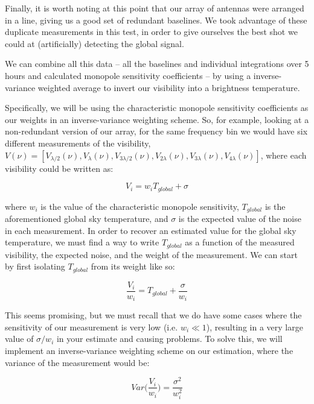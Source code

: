 Finally, it is worth noting at this point that our array of antennas were 
arranged in a line, giving us a good set of redundant baselines. We took 
advantage of these duplicate measurements in this test, in order to give 
ourselves the best shot we could at (artificially) detecting the global signal.

We can combine all this data -- all the baselines and individual integrations 
over 5 hours and calculated monopole sensitivity coefficients -- by using a 
inverse-variance weighted average to invert our visibility into a brightness 
temperature.

Specifically, we will be using the characteristic monopole sensitivity 
coefficients as our weights in an inverse-variance weighting scheme. So, for 
example, looking at a non-redundant version of our array, for the same 
frequency bin we would have six different measurements of the visibility, 
$V(\nu) = [V_{\lambda/2}(\nu), V_{\lambda}(\nu), V_{3\lambda/2}(\nu), 
V_{2\lambda}(\nu), V_{3\lambda}(\nu), V_{4\lambda}(\nu)]$, where each 
visibility could be written as:

\begin{equation}
    V_i = w_i T_{global} + \sigma
    \label{eq:vis-weight}
\end{equation}

where $w_i$ is the value of the characteristic monopole sensitivity, 
$T_{global}$ is the aforementioned global sky temperature, and $\sigma$ is the 
expected value of the noise in each measurement. In order to recover an 
estimated value for the global sky temperature, we must find a way to write 
$T_{global}$ as a function of the measured visibility, the expected noise, and 
the weight of the measurement.  We can start by first isolating $T_{global}$ 
from its weight like so:

\begin{equation}
    \frac{V_i}{w_i} = T_{global} + \frac{\sigma}{w_i}
    \label{eq:isolated-temp}
\end{equation}

This seems promising, but we must recall that we do have some cases where the 
sensitivity of our measurement is very low (i.e. $w_i \ll 1$), resulting in a 
very large value of $\sigma/w_i$ in your estimate and causing problems. To 
solve this, we will implement an inverse-variance weighting scheme on our 
estimation, where the variance of the measurement would be:

\begin{equation}
    Var\Big(\frac{V_i}{w_i}\Big) = \frac{\sigma^2}{w_i^2}
    \label{eq:variance}
\end{equation}

